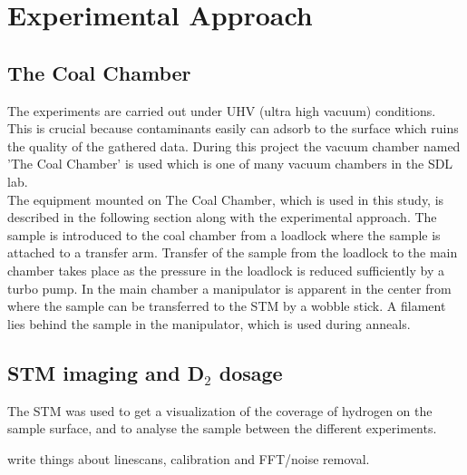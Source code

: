 \chapter{Experimental Approach}
\label{cha:procedure}

\section{The Coal Chamber}

  The experiments are carried out under UHV (ultra high vacuum) conditions. This is crucial because contaminants easily can adsorb to the surface which ruins the quality of the gathered data. During this project the vacuum chamber named 'The Coal Chamber' is used which is one of many vacuum chambers in the SDL lab.\\
  The equipment mounted on The Coal Chamber, which is used in this study, is described in the following section along with the experimental approach. The sample is introduced to the coal chamber from a loadlock where the sample is attached to a transfer arm. Transfer of the sample from the loadlock to the main chamber takes place as the pressure in the loadlock is reduced sufficiently by a turbo pump. In the main chamber a manipulator is apparent in the center from where the sample can be transferred to the STM by a wobble stick. A filament lies behind the sample in the manipulator, which is used during anneals.

%

\section{STM imaging and D$_2$ dosage}

The STM was used to get a visualization of the coverage of hydrogen on the sample surface, and to analyse the sample between the different experiments.


write things about linescans, calibration and FFT/noise removal.

